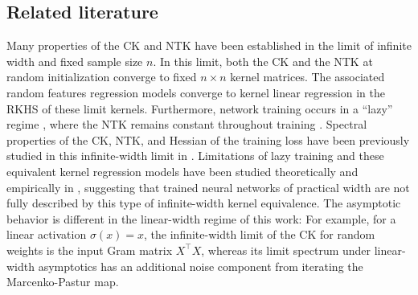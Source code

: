 \documentclass{article}
\theoremstyle{definition}
\newcommand{\1}{\mathbf{1}}
\begin{document}
\subsection{Related literature}

Many properties of the CK and NTK have been established in the limit of infinite
width and fixed sample size $n$. In this limit, both the CK
\cite{neal1995bayesian,williams1997computing,daniely2016toward,lee2018deep,matthews2018gaussian}
and the NTK \cite{jacot2018neural,lee2019wide,yang2019scaling} at random
initialization converge to fixed $n \times n$ kernel matrices. The associated
random features regression models converge to kernel linear regression in the
RKHS of these limit kernels. Furthermore, network training occurs
in a ``lazy'' regime \cite{chizat2019lazy}, where the NTK remains constant
throughout training
\cite{jacot2018neural,du2019gradienta,du2019gradientb,allen2019convergence,lee2019wide,arora2019exact}.
Spectral properties of the CK, NTK, and Hessian of the
training loss have been previously studied in this infinite-width limit in
\cite{poole2016exponential,sagun2018empirical,xiao2019disentangling,karakida2019universal,geiger2019jamming,jacot2019asymptotic}.
Limitations of lazy training and these equivalent kernel 
regression models have been studied theoretically and empirically in
\cite{chizat2019lazy,arora2019exact,yehudai2019power,ghorbani2019limitations,ghorbani2019linearized,liang2019risk},
suggesting that trained neural networks of practical width are not fully
described by this type of infinite-width kernel equivalence. The asymptotic
behavior is different in the linear-width regime of this work:
For example, for a linear activation $\sigma(x)=x$, the infinite-width limit
of the CK for random weights is the input Gram matrix
$X^\top X$, whereas its limit spectrum under linear-width asymptotics has an
additional noise component from iterating the Marcenko-Pastur map.
\end{document}
